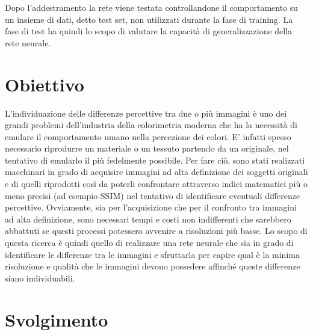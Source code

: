 \documentclass[a4paper,11pt]{article}
\begin{document}
    Dopo l’addestramento la rete viene testata controllandone il comportamento su un insieme di dati, detto test set, non utilizzati durante la fase di training. La fase di test ha quindi lo scopo 
    di valutare la capacità di generalizzazione della rete neurale.


    \section{Obiettivo}
    L'individuazione delle differenze percettive tra due o più immagini è uno dei grandi problemi dell'industria della colorimetria moderna che ha la necessità di emulare il 
    comportamento umano nella percezione dei colori. E' infatti spesso necessario riprodurre un materiale o un tessuto partendo da un originale, nel tentativo di emularlo il più fedelmente possibile. 
    Per fare ciò, sono stati realizzati macchinari in grado di acquisire immagini ad alta definizione dei soggetti originali e di quelli riprodotti così da poterli confrontare attraverso indici matematici più o meno precisi (ad esempio SSIM) 
    nel tentativo di identificare eventuali differenze percettive. Ovviamente, sia per l'acquisizione che per il confronto tra immagini ad alta definizione, sono necessari tempi e costi non indifferenti che sarebbero abbattuti se questi processi potessero avvenire a risoluzioni più basse.
    Lo scopo di questa ricerca è quindi quello di realizzare una rete neurale che sia in grado di identificare le differenze tra le immagini e sfruttarla per capire qual è la minima risoluzione e qualità che le immagini devono possedere affinché queste differenze siano individuabili.

    \newpage

    \section{Svolgimento}
\end{document}
